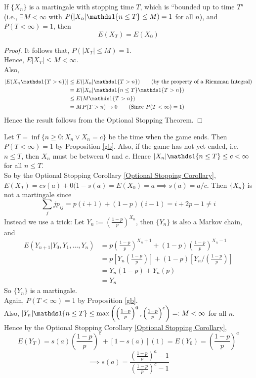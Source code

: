 \documentclass[11pt]{article}
\begin{document}
     If $\{X_n\}$ is a martingale with stopping time $T$, which is ``bounded up to time $T$" (i.e., $\exists M < \infty$ with $P(|X_n|\id{n\leq T} \leq M) = 1$ for all $n$), and $P(T<\infty) = 1$, then 
    $$E(X_T) = E(X_0)$$
    \begin{proof}
    	It follows that, $P(|X_T| \leq M) = 1$.\\
    	Hence, $E|X_T| \leq M < \infty$.\\
    	Also, 
    	\begin{align*}
    		|E(X_n\id{T>n})| &\leq E(|X_n|\id{T>n})\tag{by the property of a Riemman Integral}\\
    		&= E(|X_n|\id{n\leq T}\id{T>n})\\
    		&\leq E(M\id{T>n}) \\
    		&= MP(T>n) \rightarrow 0 \tag{Since $P(T<\infty) = 1$}
    	\end{align*}
    	Hence the result follows from the Optional Stopping Theorem.
    \end{proof}
    
    \example[\label{Gambler's Ruin problem - $p = 1/2$}Gambler's Ruin problem - $p = 1/2$]
    Let $T = \inf\{ n \geq 0:X_n \lor X_n = c\}$ be the time when the game ends. Then $P(T<\infty) = 1$ by Proposition \ref{gb}. Also, if the game has not yet ended, i.e. $n \leq T$, then $X_n$ must be between $0$ and $c$. Hence $|X_n|\id{n \leq T}\leq c < \infty$ for all $n \leq T$.\\
    So by the Optional Stopping Corollary \ref{Optional Stopping Corollary}, $E(X_T) = cs(a) + 0(1-s(a) = E(X_0) = a \implies s(a) = a/c$.
    Then $\{X_n\}$ is not a martingale since 
    $$\sum_{j}jp_{ij} = p(i+1) + (1-p)(i-1) = i + 2p - 1 \neq i$$
    Instead we use a trick: Let $Y_n := \left( \frac{1-p}{p}  \right)^{X_n}$, then $\{Y_n\}$ is also a Markov chain, and
    \begin{align*}
    	E(Y_{n+1}|Y_0, Y_1, \hdots, Y_n) &= p\left( \frac{1-p}{p}\right)^{X_n + 1} + (1-p)\left( \frac{1-p}{p}   \right)^{X_n - 1} \\
    	&= p\left[ Y_n \left( \frac{1-p}{p}\right) \right] + (1-p)\left[ Y_n / \left( \frac{1-p}{p}\right) \right] \\
    	&= Y_n (1-p) + Y_n(p) \\
    	&= Y_n
    \end{align*}
    So $\{Y_n\}$ is a martingale.\\
    Again, $P(T<\infty) = 1$ by Proposition \ref{gb}. \\
    Also, $|Y_n|\id{n\leq T} \leq \max\left(  \left( \frac{1-p}{p}\right)^0, \left( \frac{1-p}{p}\right)^c \right) =: M < \infty$ for all $n$. Hence by the Optional Stopping Corollary \ref{Optional Stopping Corollary}, $$E(Y_T) = s(a)\left( \frac{1-p}{p}\right)^c + [1-s(a)](1) = E(Y_0) = \left( \frac{1-p}{p}\right)^a$$
    $$\implies s(a) = \frac{\left( \frac{1-p}{p}\right)^a-1}{\left( \frac{1-p}{p}\right)^c - 1}$$
\end{document}
